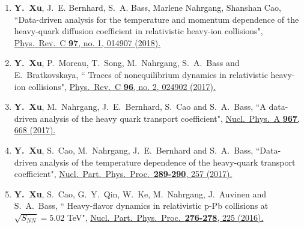

\begin{cventries}

\begin{enumerate}[wide, labelwidth=!, labelindent=0pt]
\item 
\cvpublication
{\textbf{Y.~Xu}, J.~E. Bernhard, S.~A. Bass, Marlene Nahrgang, Shanshan Cao, }
{``Data-driven analysis for the temperature and momentum dependence of the heavy-quark diffusion coefficient in relativistic heavy-ion collisions", } 
{\href{https://journals.aps.org/prc/pdf/10.1103/PhysRevC.97.014907}{Phys.\ Rev.\ C {\bf 97}, no. 1, 014907 (2018).}}


\item 
\cvpublication
{\textbf{Y.~Xu}, P.~Moreau, T.~Song, M.~Nahrgang, S.~A.~Bass and E.~Bratkovskaya, }
{`` Traces of nonequilibrium dynamics in relativistic heavy-ion collisions", } {\href{https://journals.aps.org/prc/abstract/10.1103/PhysRevC.96.024902}{Phys.\ Rev.\ C {\bf 96}, no. 2, 024902 (2017).}}

\item 
\cvpublication
{\textbf{Y.~Xu}, M.~Nahrgang, J.~E.~Bernhard, S.~Cao and S.~A.~Bass, }
{``A data-driven analysis of  the heavy quark transport coefficient", }
{\href{https://doi.org/10.1016/j.nuclphysa.2017.05.035}{Nucl.\ Phys.\ A {\bf 967}, 668 (2017).}}


\item 
\cvpublication
{\textbf{Y.~Xu}, S.~Cao, M.~Nahrgang, J.~E.~Bernhard and S.~A.~Bass, }
{``Data-driven analysis of the temperature dependence of the heavy-quark transport coefficient", }
{\href{https://doi.org/10.1016/j.nuclphysbps.2017.05.058}{Nucl.\ Part.\ Phys.\ Proc.\  {\bf 289-290}, 257 (2017).}}


\item 
\cvpublication
{\textbf{Y.~Xu}, S.~Cao, G.~Y.~Qin, W.~Ke, M.~Nahrgang, J.~Auvinen and S.~A.~Bass, }
{`` Heavy-flavor dynamics in relativistic p-Pb collisions at $\sqrt{S_{NN}}=5.02$ TeV", } {\href{https://doi.org/10.1016/j.nuclphysbps.2016.05.050}{Nucl.\ Part.\ Phys.\ Proc.\  {\bf 276-278}, 225 (2016).}}
\end{enumerate}

    \end{cventries}
